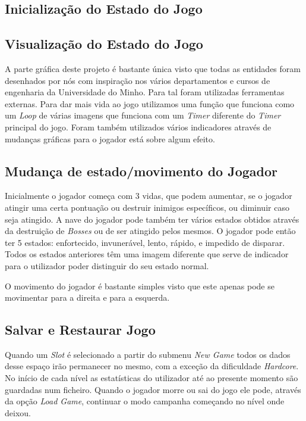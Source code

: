 \documentclass[a4paper,11pt]{article}
\newcommand\tab[1][0.8cm]{\hspace*{#1}}
\begin{document}
\subsection{Inicialização do Estado do Jogo}
\pagebreak

\subsection{Visualização do Estado do Jogo}
 \tab A parte gráfica deste projeto é bastante única visto que todas as entidades foram desenhados por nós com inspiração nos vários departamentos e cursos de engenharia da Universidade do Minho. Para tal foram utilizadas ferramentas externas. Para dar mais vida ao jogo utilizamos uma função que funciona como um \textit{Loop} de várias imagens que funciona com um \textit{Timer} diferente do \textit{Timer} principal do jogo. Foram também utilizados vários indicadores através de mudanças gráficas para o jogador está sobre algum efeito.

\subsection{Mudança de estado/movimento do Jogador}
\tab Inicialmente o jogador começa com 3 vidas, que podem aumentar, se o jogador atingir uma certa pontuação ou destruir inimigos específicos, ou diminuir caso seja atingido. A nave do jogador pode também ter vários estados obtidos através da destruição de \textit{Bosses} ou de ser atingido pelos mesmos. O jogador pode então ter 5 estados: enfortecido, invunerável, lento, rápido, e impedido de disparar. Todos os estados anteriores têm uma imagem diferente que serve de indicador para o utilizador poder distinguir do seu  estado normal. 

\vspace{8pt}
 O movimento do jogador é bastante simples visto que este apenas pode se movimentar para a direita e para a esquerda.
\pagebreak

\subsection{Salvar e Restaurar Jogo}
\tab Quando um \textit{Slot} é selecionado a partir do submenu \textit{New Game} todos os dados desse espaço irão permanecer no mesmo, com a exceção da dificuldade \textit{Hardcore}. No início de cada nível as estatísticas do utilizador até ao presente momento são guardadas num ficheiro. Quando o jogador morre ou sai do jogo ele pode, através da opção \textit{Load Game}, continuar o modo campanha começando no nível onde deixou. 
\pagebreak
\end{document}
